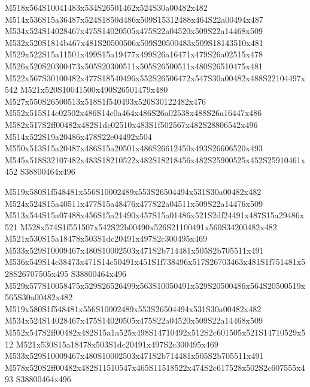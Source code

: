\documentclass{article}
\begin{document}
\begin{multicols}{2}
M518x564S10041483x534S26501462x524S30a00482x482 M514x536S15a36487x524S1850d486x509S15312488x464S22a00494x487 M534x524S14028467x475S14020505x475S22a04520x509S22a14468x509 M532x520S1814b467x481S20500506x509S20500483x509S18143510x481 M529x522S15a11501x499S15a19477x499S26a16471x479S26a02515x478 M526x520S20300473x505S20300511x505S26500511x480S26510475x481 M522x567S30100482x477S18540496x552S26506472x547S30a00482x488S22104497x542 M521x520S10041500x490S26501479x480 M527x550S26500513x518S1f540493x526S30122482x476 M552x515S14c02502x486S14c0a464x486S26a02538x488S26a16447x486 M582x517S2ff00482x482S1dc02510x483S1f502567x482S28806542x496 M514x522S19a20486x478S22e04492x504 M550x513S15a20487x486S15a20501x486S26612450x493S26606520x493 M545x518S32107482x483S18210522x482S18218456x482S25900525x452S25910461x452 S38800464x496

M519x580S1f548481x556S10002489x553S26504494x531S30a00482x482 M524x524S15a40511x477S15a48476x477S22a04511x509S22a14476x509 M513x544S15a07488x456S15a21490x457S15a01486x521S2df24491x487S15a29486x521 M528x574S1f551507x542S22b00490x526S21100491x560S34200482x482 M521x530S15a18478x503S1dc20491x497S2c300495x469 M533x529S10009467x480S10002503x471S2b714481x505S2b705511x491 M536x549S14c38473x471S14c50491x451S1f738496x517S26703463x481S1f751481x528S26707505x495 S38800464x496 M529x577S10058475x529S26526499x563S10050491x529S20500486x564S20500519x565S30a00482x482 M519x580S1f548481x556S10002489x553S26504494x531S30a00482x482 M534x524S14028467x475S14020505x475S22a04520x509S22a14468x509 M552x547S2ff00482x482S15a1a525x498S14710492x512S2c601505x521S14710529x512 M521x530S15a18478x503S1dc20491x497S2c300495x469 M533x529S10009467x480S10002503x471S2b714481x505S2b705511x491 M578x520S2ff00482x482S11510547x465S11518522x474S2c617528x502S2c607555x493 S38800464x496


\end{multicols}
\end{document}
